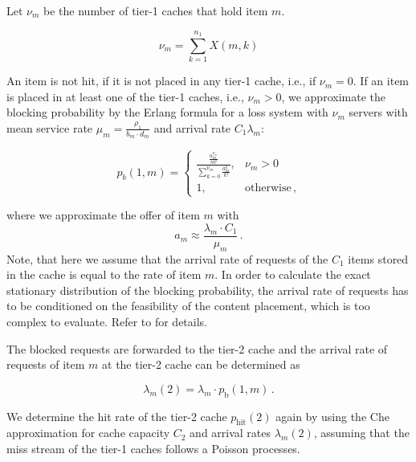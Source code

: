 Let $\nu_m$ be the number of tier-1 caches that hold item $m$.

\begin{equation}
\nu_m=\sum_{k=1}^{n_1} X(m,k)
\end{equation}

An item is not hit, if it is not placed in any tier-1 cache, i.e., if $\nu_m=0$.
If an item is placed in at least one of the tier-1 caches, i.e., $\nu_m>0$, we approximate the blocking probability by the Erlang formula for a loss system with $\nu_m$ servers with mean service rate $\mu_{m} = \frac{\rho_1}{b_m\cdot d_m}$ and arrival rate $C_1\lambda_m$:


\begin{equation}
p_{b}(1,m) =
	\begin{cases}
		\frac{\frac{a_m^{\nu_m}}{m!}}{\sum_{k=0}^{\nu_m}\frac{a_m^k}{k!}}, & \nu_m>0 \\
    1, & \text{otherwise} \, ,
	\end{cases}
\end{equation}

where we approximate the offer of item $m$ with
\begin{equation}
a_m \approx \frac{\lambda_m\cdot C_1}{\mu_m} \, .
\end{equation}
Note, that here we assume that the arrival rate of requests of the $C_1$ items stored in the cache is equal to the rate of item $m$.
In order to calculate the exact stationary distribution of the blocking probability, the arrival rate of requests has to be conditioned on the feasibility of the content placement, which is too complex to evaluate.
Refer to \cite{tan2013optimal} for details.

The blocked requests are forwarded to the tier-2 cache and the arrival rate of requests of item $m$ at the tier-2 cache can be determined as

\begin{equation}
	\lambda_m(2) = \lambda_m\cdot p_\text{b}(1,m) \, .
\end{equation}

We determine the hit rate of the tier-2 cache $p_\text{hit}(2)$ again by using the Che approximation for cache capacity $C_2$ and arrival rates $\lambda_m(2)$, assuming that the miss stream of the tier-1 caches follows a Poisson processes.

